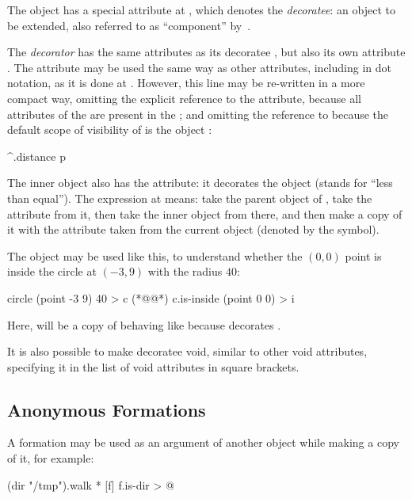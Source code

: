 The object  has a special attribute 
at , which denotes
the \emph{decoratee}: an object to be extended,
also referred to as ``component'' by~\citet{gamma1994design}.

The \emph{decorator} 
has the same attributes as its decoratee , but also
its own attribute . The attribute  may be used
the same way as other attributes, including in dot notation, as it is done
at . However, this line
may be re-written in a more compact way, omitting the explicit
reference to the  attribute, because all attributes
of the  are present in the ;
and omitting the reference to \ff{\$} because the default scope of visibility of
 is the object :

\begin{ffcode}
^.distance p
\end{ffcode}

The inner object  also has the  attribute: it
decorates the object  (stands for ``less than equal'').
The expression at  means:
take the parent object of ,
take the attribute  from it, then take the inner object 
from there, and then make a copy of it with the attribute 
taken from the current object (denoted by the \ff{\$} symbol).

The object  may be used like this, to understand whether
the \((0,0)\) point is inside the circle at \((-3,9)\) with the radius \(40\):

\begin{ffcode}
circle (point -3 9) 40 > c  (*@\label{ln:circle-c}@*)
c.is-inside (point 0 0) > i
\end{ffcode}

Here,  will be a copy of  behaving like 
because  decorates .

It is also possible to make decoratee void, similar to other void
attributes, specifying it in the list of void attributes in
square brackets.

\subsection{Anonymous Formations}

A formation may be used as an argument of another object while
making a copy of it, for example:

\begin{ffcode}
(dir "/tmp").walk
  *
    [f]
      f.is-dir > @
\end{ffcode}

